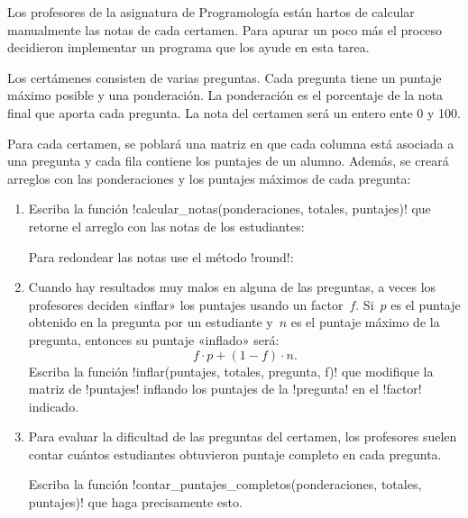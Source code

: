 Los profesores de la asignatura de Programología están hartos
de calcular manualmente las notas de cada certamen.
Para apurar un poco más el proceso
decidieron implementar un programa que los ayude en esta tarea.

Los certámenes consisten de varias preguntas.
Cada pregunta tiene un puntaje máximo posible y una ponderación.
La ponderación es el porcentaje de la nota final
que aporta cada pregunta.
La nota del certamen será un entero ente 0 y 100.

Para cada certamen,
se poblará una matriz en que cada columna está asociada a una pregunta
y cada fila contiene los puntajes de un alumno.
Además,
se creará arreglos con las ponderaciones y los puntajes máximos
de cada pregunta:



\begin{enumerate}[leftmargin=0pt,label=\emph{\alph*})]

  \item
    Escriba la función \li!calcular_notas(ponderaciones, totales, puntajes)!
    que retorne el arreglo con las notas de los estudiantes:
    

    Para redondear las notas use el método \li!round!:
    

  \item
    Cuando hay resultados muy malos en alguna de las preguntas,
    a veces los profesores deciden «inflar» los puntajes
    usando un factor~\(f\).
    Si~\(p\) es el puntaje obtenido en la pregunta por un estudiante
    y~\(n\) es el puntaje máximo de la pregunta,
    entonces su puntaje «inflado» será:
    \[
        f\cdot p + (1 - f)\cdot n.
    \]
    Escriba la función \li!inflar(puntajes, totales, pregunta, f)!
    que modifique la matriz de \li!puntajes!
    inflando los puntajes de la \li!pregunta!
    en el \li!factor! indicado.
    

  \item
    Para evaluar la dificultad de las preguntas del certamen,
    los profesores suelen contar cuántos estudiantes obtuvieron puntaje completo
    en cada pregunta.

    Escriba la función \li!contar_puntajes_completos(ponderaciones, totales, puntajes)!
    que haga precisamente esto.
    

\end{enumerate}

